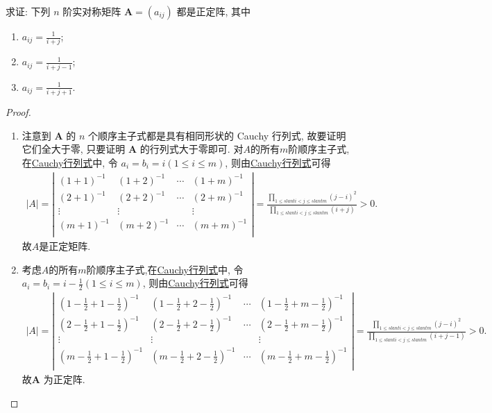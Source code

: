 \documentclass[../../main.tex]{subfiles}
\begin{document}
\begin{example}\label{example:例8.48}
求证: 下列 \(n\) 阶实对称矩阵 \(\boldsymbol{A}=(a_{ij})\) 都是正定阵, 其中
\begin{enumerate}[(1)]
\item \(a_{ij}=\frac{1}{i + j}\);
\item \(a_{ij}=\frac{1}{i + j - 1}\);
\item \(a_{ij}=\frac{1}{i + j + 1}\).
\end{enumerate}
\end{example}
\begin{proof}
\begin{enumerate}[(1)]
\item 注意到 \(\boldsymbol{A}\) 的 \(n\) 个顺序主子式都是具有相同形状的 Cauchy 行列式, 故要证明它们全大于零, 只要证明 \(\boldsymbol{A}\) 的行列式大于零即可. 对$A$的所有$m$阶顺序主子式,在\hyperref[Cauchy行列式]{Cauchy行列式}中, 令 \(a_i = b_i = i(1\leqslant  i\leqslant  m)\), 则由\hyperref[Cauchy行列式]{Cauchy行列式}可得
\begin{align*}
|A|=\left| \begin{matrix}
(1+1)^{-1}&		(1+2)^{-1}&		\cdots&		(1+m)^{-1}\\
(2+1)^{-1}&		(2+2)^{-1}&		\cdots&		(2+m)^{-1}\\
\vdots&		\vdots&		&		\vdots\\
(m+1)^{-1}&		(m+2)^{-1}&		\cdots&		(m+m)^{-1}\\
\end{matrix} \right|=\frac{\prod\limits_{1\leqslant slant i<j\leqslant slant m}{\left( j-i \right) ^2}}{\prod\limits_{1\leqslant slant i<j\leqslant slant m}{\left( i+j \right)}}>0.
\end{align*}
故$A$是正定矩阵.

\item 考虑$A$的所有$m$阶顺序主子式,在\hyperref[Cauchy行列式]{Cauchy行列式}中, 令 \(a_i = b_i = i-\frac{1}{2}(1\leqslant  i\leqslant  m)\), 则由\hyperref[Cauchy行列式]{Cauchy行列式}可得
\begin{align*}
|A|=\left| \begin{matrix}
(1-\frac{1}{2}+1-\frac{1}{2})^{-1}&		(1-\frac{1}{2}+2-\frac{1}{2})^{-1}&		\cdots&		(1-\frac{1}{2}+m-\frac{1}{2})^{-1}\\
(2-\frac{1}{2}+1-\frac{1}{2})^{-1}&		(2-\frac{1}{2}+2-\frac{1}{2})^{-1}&		\cdots&		(2-\frac{1}{2}+m-\frac{1}{2})^{-1}\\
\vdots&		\vdots&		&		\vdots\\
(m-\frac{1}{2}+1-\frac{1}{2})^{-1}&		(m-\frac{1}{2}+2-\frac{1}{2})^{-1}&		\cdots&		(m-\frac{1}{2}+m-\frac{1}{2})^{-1}\\
\end{matrix} \right|=\frac{\prod\limits_{1\leqslant slant i<j\leqslant slant m}{\left( j-i \right) ^2}}{\prod\limits_{1\leqslant slant i<j\leqslant slant m}{\left( i+j-1 \right)}}>0.
\end{align*}
故\(\boldsymbol{A}\) 为正定阵.


\end{enumerate}
\end{proof}
\end{document}
